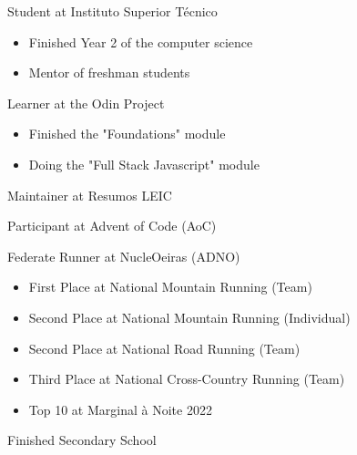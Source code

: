 \documentclass[10pt,a4paper,ragged2e,withhyper]{altacv}
\begin{document}
\begin{paracol}{2}


Student at Instituto Superior Técnico

\begin{itemize}
\item Finished Year 2 of the computer science
\item Mentor of freshman students
\end{itemize}

\divider

Learner at the Odin Project

\begin{itemize}
\item Finished the "Foundations" module 
\item Doing the "Full Stack Javascript" module
\end{itemize}


\divider

Maintainer at Resumos LEIC


\divider

Participant at Advent of Code (AoC)


\divider

Federate Runner at NucleOeiras (ADNO)

\begin{itemize}

\item First Place at National Mountain Running (Team)
\item Second Place at National Mountain Running (Individual)
\item Second Place at National Road Running (Team)
\item Third Place at National Cross-Country Running (Team)
\item Top 10 at Marginal à Noite 2022

\end{itemize}
\divider

Finished Secondary School
\begin{itemize}


\end{itemize}
\end{paracol}
\end{document}
